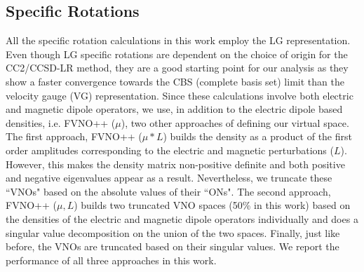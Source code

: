 \subsection{Specific Rotations}
All the specific rotation calculations in this work employ the LG representation.
Even though LG specific rotations are dependent on the choice of origin for the CC2/CCSD-LR method,
they are a good starting point for our analysis as they show a faster convergence towards the CBS 
(complete basis set) limit than the velocity gauge (VG) representation. Since these calculations 
involve both electric and magnetic dipole operators, we use, in addition to the electric dipole 
based densities, i.e. FVNO++ ($\mu$), two other approaches of defining our virtual space.
The first approach, FVNO++ ($\mu*L$) builds the density as a product of the first order amplitudes corresponding
to the electric and magnetic perturbations ($L$). However, this makes the density matrix non-positive 
definite and both positive and negative eigenvalues appear as a result. Nevertheless, we truncate 
these ``VNOs" based on the absolute values of their ``ONs". The second approach, FVNO++ ($\mu,L$) builds two truncated VNO 
spaces (50\% in this work) based on the densities of the electric and magnetic dipole operators individually and does a singular 
value decomposition on the union of the two spaces. Finally, just like before, the VNOs are truncated based on their singular values.
We report the performance of all three approaches in this work.
%
%
%
